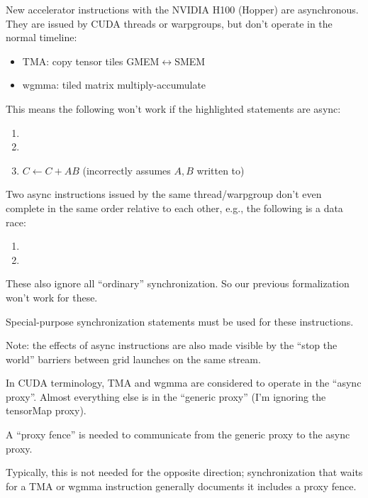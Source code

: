 \begin{minipage}[t]{0.5\textwidth}\fixminipage
New accelerator instructions with the NVIDIA H100 (Hopper) are asynchronous.
They are issued by CUDA threads or warpgroups, but don't operate in the normal timeline:
\begin{itemize}
  \item TMA: copy tensor tiles GMEM$\leftrightarrow$SMEM
  \item wgmma: tiled matrix multiply-accumulate
\end{itemize}
This means the following won't work if the highlighted statements are async:
\begin{enumerate}
  \item {}
  \item {}
  \item $C \leftarrow C + AB$ (incorrectly assumes $A,B$ written to)
\end{enumerate}
Two async instructions issued by the same thread/warpgroup don't even complete in the same order relative to each other, e.g., the following is a data race:
\begin{enumerate}
  \item {}
  \item {}
\end{enumerate}
\end{minipage}
\hfill
\begin{minipage}[t]{0.5\textwidth}\fixminipage
These also ignore all ``ordinary'' synchronization.
So our previous formalization won't work for these.

Special-purpose synchronization statements must be used for these instructions.

Note: the effects of async instructions are also made visible by the ``stop the world'' barriers between grid launches on the same stream.


In CUDA terminology, TMA and wgmma are considered to operate in the ``async proxy''.
Almost everything else is in the ``generic proxy'' (I'm ignoring the tensorMap proxy).

A ``proxy fence'' is needed to communicate from the generic proxy to the async proxy.

Typically, this is not needed for the opposite direction; synchronization that waits for a TMA or wgmma instruction generally documents it includes a proxy fence.
\end{minipage}

